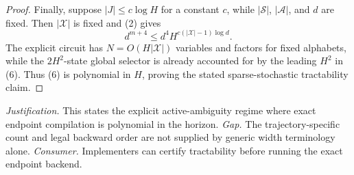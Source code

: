 \documentclass{article}
\begin{document}
\begin{proof}
Finally, suppose \(|J|\le c\log H\) for a constant \(c\), while \(|\mathcal S|\), \(|\mathcal A|\), and \(d\) are fixed.  Then \(|\mathcal X|\) is fixed and (2) gives
\[
 d^{m+4}\le d^4H^{c(|\mathcal X|-1)\log d}.
\]
The explicit circuit has \(N=O(H|\mathcal X|)\) variables and factors for fixed alphabets, while the \(2H^2\)-state global selector is already accounted for by the leading \(H^2\) in (6).  Thus (6) is polynomial in \(H\), proving the stated sparse-stochastic tractability claim.
\end{proof}
\par\smallskip\noindent \textit{Justification.} This states the explicit active-ambiguity regime where exact endpoint compilation is polynomial in the horizon. \textit{Gap.} The trajectory-specific count and legal backward order are not supplied by generic width terminology alone. \textit{Consumer.} Implementers can certify tractability before running the exact endpoint backend.
\end{document}
